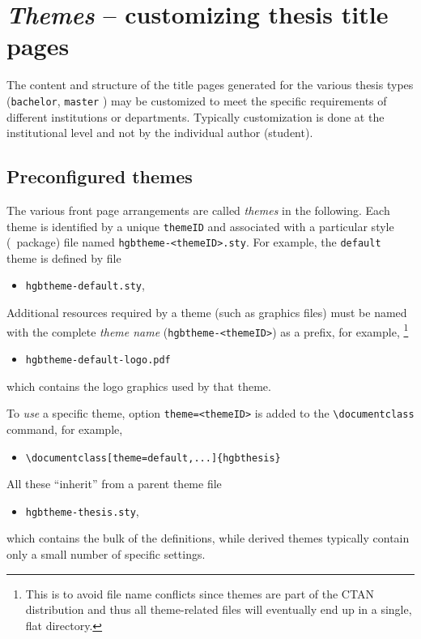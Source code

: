 \documentclass[english]{hgbarticle}
\begin{document}
\section{\emph{Themes} -- customizing thesis title pages}
\label{sec:Themes}

The content and structure of the title pages generated for the various thesis types
(\texttt{bachelor}, \texttt{master} \etc) may be customized to meet the specific
requirements of different institutions or departments.
Typically customization is done at the institutional level and not
by the individual author (student).

\subsection{Preconfigured themes}

The various front page arrangements are called \emph{themes} in the following.
Each theme is identified by a unique \texttt{themeID} and associated with a 
particular style (\latex\ package) file named \verb!hgbtheme-<themeID>.sty!.
For example, the \texttt{default} theme  is defined by file
\begin{itemize}
  \item[] \texttt{hgbtheme-default.sty},
\end{itemize}
%
Additional resources required by a theme (such as graphics files) must be named with the 
complete \emph{theme name} (\verb!hgbtheme-<themeID>!) as a prefix, for example,%
\footnote{This is to avoid file name conflicts since themes are part of the 
CTAN distribution and thus all theme-related files will eventually end up in a single, 
flat directory.}
\begin{itemize}
	\item[] \texttt{hgbtheme-default-logo.pdf}
\end{itemize}
%
which contains the logo graphics used by that theme.

To \emph{use} a specific theme, option \verb!theme=<themeID>! is added to the 
\verb!\documentclass! command, for example,
\begin{itemize}
	\item[] \verb!\documentclass[theme=default,...]{hgbthesis}!
\end{itemize}


All these ``inherit'' from a parent theme file
%
\begin{itemize}
  \item[] \texttt{hgbtheme-thesis.sty},
\end{itemize}
%
which contains the bulk of the definitions, while derived themes typically contain only 
a small number of specific settings.
\end{document}
